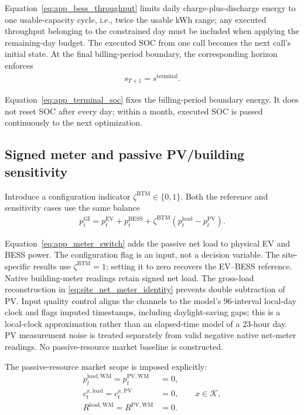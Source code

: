 \documentclass[final,5p,times]{elsarticle}
\newcommand{\EV}{\mathrm{EV}}
\newcommand{\BESS}{\mathrm{BESS}}
\newcommand{\GI}{\mathrm{GI}}
\newcommand{\PV}{\mathrm{PV}}
\newcommand{\WM}{\mathrm{WM}}
\newcommand{\load}{\mathrm{load}}
\newcommand{\calK}{\mathcal{K}}
\begin{document}
Equation~\eqref{eq:app_bess_throughput} limits daily charge-plus-discharge energy to one usable-capacity cycle, i.e., twice the usable kWh range; any executed throughput belonging to the constrained day must be included when applying the remaining-day budget.
The executed SOC from one call becomes the next call's initial state. At the final billing-period boundary, the corresponding horizon enforces
\begin{align}
s_{T+1}=s^{\mathrm{terminal}}. \label{eq:app_terminal_soc}
\end{align}

Equation~\eqref{eq:app_terminal_soc} fixes the billing-period boundary energy. It does not reset SOC after every day; within a month, executed SOC is passed continuously to the next optimization.

\subsection{Signed meter and passive PV/building sensitivity}
Introduce a configuration indicator $\zeta^{\mathrm{BTM}}\in\{0,1\}$. Both
the reference and sensitivity cases use the same balance
\begin{align}
p_t^{\GI}=p_t^{\EV}+p_t^{\BESS}
+\zeta^{\mathrm{BTM}}(p_t^{\load}-p_t^{\PV}). \label{eq:app_meter_switch}
\end{align}

Equation~\eqref{eq:app_meter_switch} adds the passive net load to physical EV and BESS power. The configuration flag is an input, not a decision variable.
The site-specific results use $\zeta^{\mathrm{BTM}}=1$; setting it to zero
recovers the EV--BESS reference. Native building-meter readings retain signed
net load. The gross-load reconstruction in \eqref{eq:site_net_meter_identity}
prevents double subtraction of PV. Input quality control aligns the channels
to the model's 96-interval local-day clock and flags imputed timestamps,
including daylight-saving gaps; this is a local-clock approximation rather
than an elapsed-time model of a 23-hour day. PV measurement noise is treated
separately from valid negative native net-meter readings. No passive-resource
market baseline is constructed.

The passive-resource market scope is imposed explicitly:
\begin{align}
p_t^{\load,\WM}=p_t^{\PV,\WM}&=0,\label{eq:app_passive_wm_energy_zero}\\
c_t^{x,\load}=c_t^{x,\PV}&=0,
\qquad x\in\calK,\label{eq:app_passive_as_zero}\\
R^{\load,\WM}=R^{\PV,\WM}&=0.\label{eq:app_passive_wm_revenue_zero}
\end{align}
\end{document}

